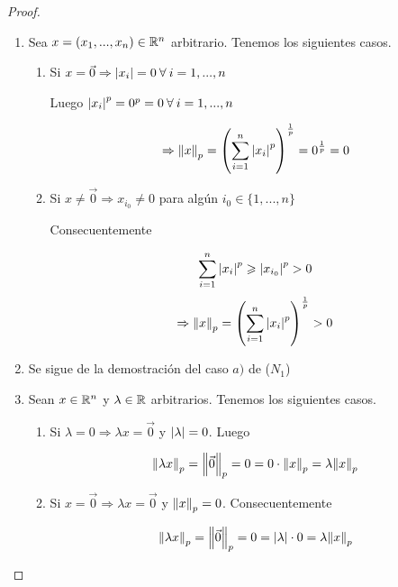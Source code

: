 \begin{proof}
    \begin{enumerate}[label=(\subscript{D}{{\arabic*}})]
    \item Sea $x=(x_1,...,x_n) \in \mathbb{R}^n$ arbitrario. Tenemos los siguientes casos.
    \begin{enumerate}
        \item Si $x=\vec{0} \Rightarrow \abs{{x}_{i}} = 0 \: \forall \: i=1,...,n$

        Luego ${\abs{{x}_{i}}}^{p} = {0}^{p} = 0 \: \forall \: i=1,...,n$ 

        \begin{equation*}
            \Rightarrow  {\norm{x}}_{p} = {\left( \sum_{i=1}^{n} {\abs{{x}_{i}}}^{p}\right)}^{\frac{1}{p}} = {0}^{\frac{1}{p}}=0 
        \end{equation*}
        \item  Si $x \neq \vec{0} \Rightarrow x_{i_0} \neq 0$ para algún $i_0 \in \{ 1,...,n \}$

        Consecuentemente 

        \begin{equation*}
            \sum_{i=1}^{n} {\abs{{x}_{i}}}^{p} \geqslant {\abs{ x_{i_0}}}^{p} > 0
        \end{equation*}
        \begin{equation*}
            \Rightarrow  {\norm{x}}_{p} = {\left( \sum_{i=1}^{n} {\abs{{x}_{i}}}^{p}\right)}^{\frac{1}{p}} > 0 
        \end{equation*}
    \end{enumerate}
    \item Se sigue de la demostración del caso $a)$ de ($N_1$)
    \item Sean $x \in \mathbb{R}^n$ y $\lambda \in \mathbb{R}$ arbitrarios. Tenemos los siguientes casos.
    \begin{enumerate}
        \item Si $\lambda = 0 \Rightarrow \lambda x = \vec{0}$ y $\abs{\lambda}=0$. Luego

        \begin{equation*}
              {\norm{\lambda x}}_{p} =   {\norm{\vec{0}}}_{p} = 0 = 0 \cdot {\norm{x}}_{p} = \lambda {\norm{x}}_{p} 
        \end{equation*}

        \item Si $x = \vec{0} \Rightarrow \lambda x = \vec{0}$ y ${\norm{x}}_{p}=0$. Consecuentemente

        \begin{equation*}
              {\norm{\lambda x}}_{p} =   {\norm{\vec{0}}}_{p} = 0 = \abs{\lambda} \cdot 0 = \lambda {\norm{x}}_{p} 
        \end{equation*}


\end{enumerate}
\end{enumerate}
\end{proof}
